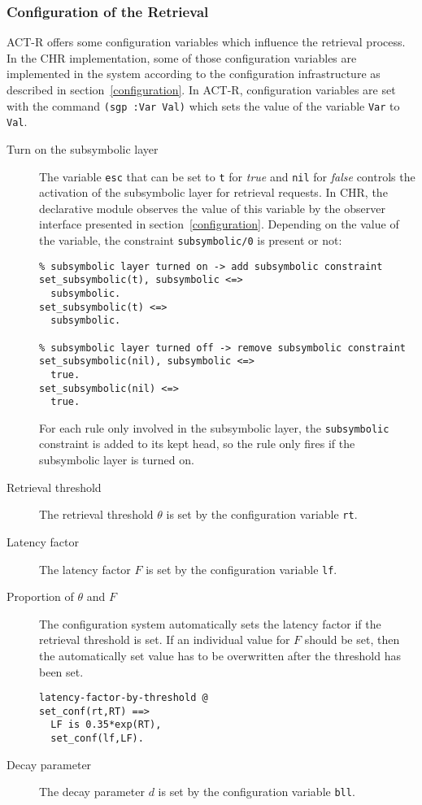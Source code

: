 \subsubsection{Configuration of the Retrieval}

ACT-R offers some configuration variables which influence the retrieval process. In the CHR implementation, some of those configuration variables are implemented in the system according to the configuration infrastructure as described in section~\ref{configuration}. In ACT-R, configuration variables are set with the command \lstinline|(sgp :Var Val)| which sets the value of the variable \lstinline|Var| to \lstinline|Val|. 

\begin{description}
 \item[Turn on the subsymbolic layer] The variable \lstinline|esc| that can be set to \lstinline|t| for \emph{true} and \lstinline|nil| for \emph{false} controls the activation of the subsymbolic layer for retrieval requests. In CHR, the declarative module observes the value of this variable by the observer interface presented in section~\ref{configuration}. Depending on the value of the variable, the constraint \lstinline|subsymbolic/0| is present or not:
 
\begin{lstlisting}
% subsymbolic layer turned on -> add subsymbolic constraint
set_subsymbolic(t), subsymbolic <=> 
  subsymbolic.
set_subsymbolic(t) <=> 
  subsymbolic.

% subsymbolic layer turned off -> remove subsymbolic constraint
set_subsymbolic(nil), subsymbolic <=> 
  true.
set_subsymbolic(nil) <=> 
  true.
\end{lstlisting}

For each rule only involved in the subsymbolic layer, the \lstinline|subsymbolic| constraint is added to its kept head, so the rule only fires if the subsymbolic layer is turned on.

\item[Retrieval threshold] The retrieval threshold $\theta$ is set by the configuration variable \lstinline|rt|.
\item[Latency factor] The latency factor $F$ is set by the configuration variable \lstinline|lf|.
\item[Proportion of $\theta$ and $F$] The configuration system automatically sets the latency factor if the retrieval threshold is set. If an individual value for $F$ should be set, then the automatically set value has to be overwritten after the threshold has been set.

\begin{lstlisting}
latency-factor-by-threshold @
set_conf(rt,RT) ==> 
  LF is 0.35*exp(RT), 
  set_conf(lf,LF). 
\end{lstlisting}

\item[Decay parameter] The decay parameter $d$ is set by the configuration variable \lstinline|bll|.

\end{description}



